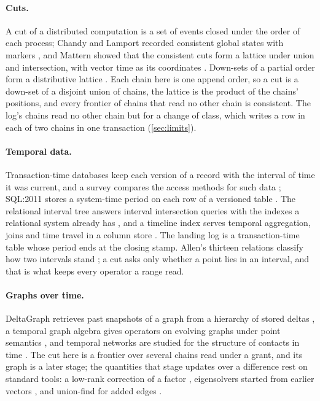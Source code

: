 \documentclass[11pt]{article}
\theoremstyle{plain}
\theoremstyle{definition}
\begin{document}
\paragraph{Cuts.} A cut of a distributed computation is a set of events closed under the order of
each process; Chandy and Lamport recorded consistent global states with markers
\cite{chandy1985snapshots}, and Mattern showed that the consistent cuts form a lattice under union
and intersection, with vector time as its coordinates \cite{mattern1989virtual}. Down-sets of a
partial order form a distributive lattice \cite{davey2002lattices}. Each chain here is one append
order, so a cut is a down-set of a disjoint union of chains, the lattice is the product of the
chains' positions, and every frontier of chains that read no other chain is consistent. The log's
chains read no other chain but for a change of class, which writes a row in each of two chains in
one transaction (\cref{sec:limits}).

\paragraph{Temporal data.} Transaction-time databases keep each version of a record with the
interval of time it was current, and a survey compares the access methods for such data
\cite{salzberg1999access}; SQL:2011 stores a system-time period on each row of a versioned table
\cite{kulkarni2012sql2011}. The relational interval tree answers interval intersection queries
with the indexes a relational system already has \cite{kriegel2000intervals}, and a timeline index
serves temporal aggregation, joins and time travel in a column store \cite{kaufmann2013timeline}.
The landing log is a transaction-time table whose period ends at the closing stamp. Allen's
thirteen relations classify how two intervals stand \cite{allen1983intervals}; a cut asks only
whether a point lies in an interval, and that is what keeps every operator a range read.

\paragraph{Graphs over time.} DeltaGraph retrieves past snapshots of a graph from a hierarchy of
stored deltas \cite{khurana2013deltagraph}, a temporal graph algebra gives operators on evolving
graphs under point semantics \cite{moffitt2017tga}, and temporal networks are studied for the
structure of contacts in time \cite{holme2012temporal}. The cut here is a frontier over several
chains read under a grant, and its graph is a later stage; the quantities that stage updates over
a difference rest on standard tools: a low-rank correction of a factor \cite{woodbury1950inverting},
eigensolvers started from earlier vectors \cite{knyazev2001lobpcg}, and union-find for added edges
\cite{tarjan1975union}.
\end{document}
